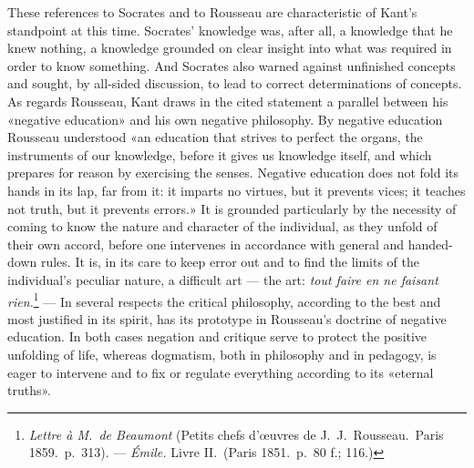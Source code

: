 \documentclass[12pt,a4paper]{article}
\begin{document}
These references to Socrates and to Rousseau are characteristic of Kant's
standpoint at this time. Socrates' knowledge was, after all, a knowledge
that he knew nothing, a knowledge grounded on clear insight into what was
required in order to know something. And Socrates also warned against
unfinished concepts and sought, by all-sided discussion, to lead to correct
determinations of concepts. As regards Rousseau, Kant draws in the cited
statement a parallel between his «negative education» and his own negative
philosophy. By negative education Rousseau understood «an education that
strives to perfect the organs, the instruments of our knowledge, before it
gives us knowledge itself, and which prepares for reason by exercising the
senses. Negative education does not fold its hands in its lap, far from it:
it imparts no virtues, but it prevents vices; it teaches not truth, but it
prevents errors.» It is grounded particularly by the necessity of coming to
know the nature and character of the individual, as they unfold of their
own accord, before one intervenes in accordance with general and handed-down
rules. It is, in its care to keep error out and to find the limits of the
individual's peculiar nature, a difficult art --- the art: \textit{tout
faire en ne faisant rien.}\footnote{\textit{Lettre à M.\ de Beaumont}
(Petits chefs d'œuvres de J.\ J.\ Rousseau.\ Paris 1859.\ p.\ 313). ---
\textit{Émile.} Livre II.\ (Paris 1851.\ p.\ 80 f.; 116.)} --- In several
respects the critical philosophy, according to the best and most justified
in its spirit, has its prototype in Rousseau's doctrine of negative
education. In both cases negation and critique serve to protect the
positive unfolding of life, whereas dogmatism, both in philosophy and in
pedagogy, is eager to intervene and to fix or regulate everything according
to its «eternal truths».
\end{document}
